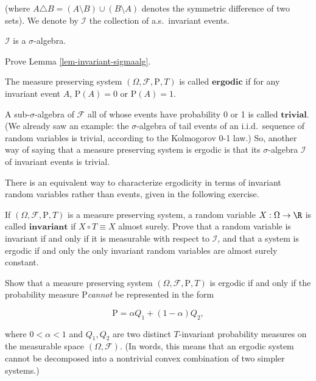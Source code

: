 \noindent (where
$A\triangle B = (A\setminus B)\cup (B\setminus A)$
denotes the symmetric difference of two sets). We
denote by $\mathcal{I}$ the collection of a.s.\
invariant events.

\begin{lem}
\label{lem-invariant-sigmaalg}
$\mathcal{I}$ is a $\sigma$-algebra.
\end{lem}

\begin{xexercise}
Prove Lemma \ref{lem-invariant-sigmaalg}.
\end{xexercise}

\begin{defn}
The measure preserving system
$(\Omega, \mathcal{F}, \mathrm{P}, T)$ is called
$\textbf{ergodic}$ if for any invariant event $A$,
$\mathrm{P}(A)=0$ or $\mathrm{P}(A)=1$.
\end{defn}

\noindent A sub-$\sigma$-algebra of $\mathcal{F}$ all of whose
events have probability 0 or 1 is called
$\textbf{trivial}$. (We already saw an example: the
$\sigma$-algebra of tail events of an i.i.d.\
sequence of random variables is trivial, according to
the Kolmogorov 0-1 law.) So, another way of saying
that a measure preserving system is ergodic is that
its $\sigma$-algebra $\mathcal{I}$ of invariant
events is trivial.

There is an equivalent way to characterize ergodicity
in terms of invariant random variables rather than
events, given in the following exercise.

\begin{xexercise}
If $(\Omega, \mathcal{F}, \mathrm{P}, T)$ is a
measure preserving system, a random variable
$X:\Omega\to\R$ is called $\textbf{invariant}$ if
$X\circ T \equiv X$ almost surely. Prove that a
random variable is invariant if and only if it is
measurable with respect to $\mathcal{I}$, and that a
system is ergodic if and only the only invariant
random variables are almost surely constant.
\end{xexercise}

\begin{xexercise}
Show that a measure preserving system
$(\Omega, \mathcal{F}, \mathrm{P}, T)$ is ergodic if
and only if the probability measure $\mathrm{P}$\emph{cannot} be represented in the form

\[
\mathrm{P} = \alpha Q_1 + (1-\alpha)Q_2,
\]

\noindent where $0<\alpha<1$ and $Q_1, Q_2$ are two distinct
$T$-invariant probability measures on the measurable
space $(\Omega, \mathcal{F})$. (In words, this means
that an ergodic system cannot be decomposed into a
nontrivial convex combination of two simpler systems.)
\end{xexercise}

